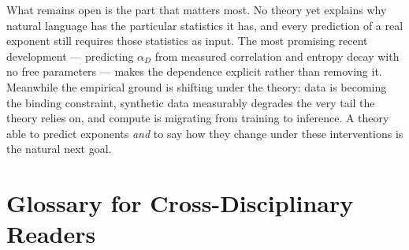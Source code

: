 \documentclass[11pt,a4paper]{article}
\theoremstyle{definition}
\begin{document}
What remains open is the part that matters most. No theory yet explains why natural language has the particular statistics it has, and every prediction of a real exponent still requires those statistics as input. The most promising recent development --- predicting $\alpha_D$ from measured correlation and entropy decay with no free parameters --- makes the dependence explicit rather than removing it. Meanwhile the empirical ground is shifting under the theory: data is becoming the binding constraint, synthetic data measurably degrades the very tail the theory relies on, and compute is migrating from training to inference. A theory able to predict exponents \emph{and} to say how they change under these interventions is the natural next goal.

\appendix

\section{Glossary for Cross-Disciplinary Readers}
\label{app:glossary}
\end{document}
